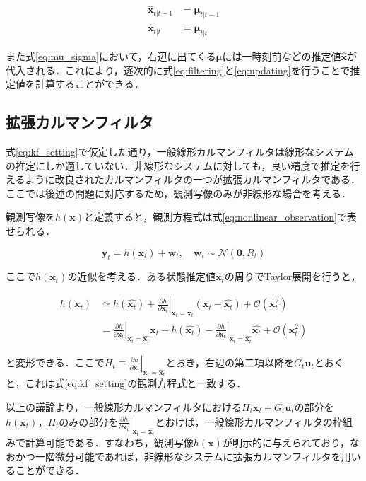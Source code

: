 \begin{equation}
    \label{eq:kf_optimal}
    \begin{aligned}
        \hat{\bm{x}}_{t|t-1} &= \bm{\mu}_{t|t-1}
        \\ \hat{\bm{x}}_{t|t} &= \bm{\mu}_{t|t}
    \end{aligned}
\end{equation}

また式\ref{eq:mu_sigma}において，右辺に出てくる$\bm{\mu}$には一時刻前などの推定値$\hat{\bm{x}}$が代入される．これにより，逐次的に式\ref{eq:filtering}と\ref{eq:updating}を行うことで推定値を計算することができる．

\subsection{拡張カルマンフィルタ}

式\ref{eq:kf_setting}で仮定した通り，一般線形カルマンフィルタは線形なシステムの推定にしか適していない．非線形なシステムに対しても，良い精度で推定を行えるように改良されたカルマンフィルタの一つが拡張カルマンフィルタである．ここでは後述の問題に対応するため，観測写像のみが非線形な場合を考える．
\par
観測写像を$h(\bm{x})$と定義すると，観測方程式は式\ref{eq:nonlinear_observation}で表せられる．

\begin{equation}
    \label{eq:nonlinear_observation}
    \bm{y}_t = h(\bm{x}_t) + \bm{w}_t, \quad \bm{w}_t \sim \mathcal{N}(\bm{0}, R_t)
\end{equation}

ここで$h(\bm{x}_t)$の近似を考える．ある状態推定値$\hat{\bm{x}_t}$の周りでTaylor展開を行うと，

\begin{equation}
    \begin{aligned}
        h(\bm{x}_t) &\simeq h(\hat{\bm{x}_t}) + \left.\frac{\partial h}{\partial \bm{x}_t} \right|_{\bm{x}_t=\hat{\bm{x}_t}} \left( \bm{x}_t - \hat{\bm{x}_t} \right) + \mathcal{O}(\bm{x}_t^2)
        \\ &= \left.\frac{\partial h}{\partial \bm{x}_t} \right|_{\bm{x}_t=\hat{\bm{x}_t}} \bm{x}_t + h(\hat{\bm{x}_t}) - \left.\frac{\partial h}{\partial \bm{x}_t} \right|_{\bm{x}_t=\hat{\bm{x}_t}} \hat{\bm{x}_t} + \mathcal{O}(\bm{x}_t^2)
    \end{aligned}
\end{equation}

と変形できる．ここで$H_t \equiv \left.\frac{\partial h}{\partial \bm{x}_t} \right|_{\bm{x}_t=\hat{\bm{x}_t}}$とおき，右辺の第二項以降を$G_t\bm{u}_t$とおくと，これは式\ref{eq:kf_setting}の観測方程式と一致する．
\par
以上の議論より，一般線形カルマンフィルタにおける$H_t \bm{x}_t + G_t \bm{u}_t$の部分を$h(\bm{x}_t)$，$H_t$のみの部分を$\left.\frac{\partial h}{\partial \bm{x}_t} \right|_{\bm{x}_t=\hat{\bm{x}_t}}$とおけば，一般線形カルマンフィルタの枠組みで計算可能である．すなわち，観測写像$h(\bm{x})$が明示的に与えられており，なおかつ一階微分可能であれば，非線形なシステムに拡張カルマンフィルタを用いることができる．

